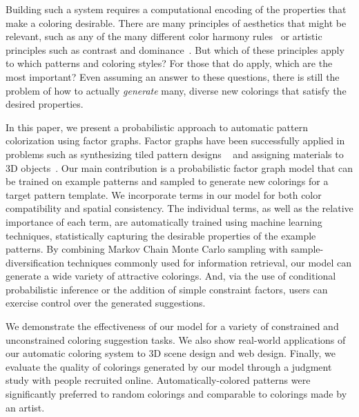 Building such a system requires a computational encoding of the properties that make a coloring desirable. There are many principles of aesthetics that might be relevant, such as any of the many different color harmony rules~\cite{ColorHarmonyBook} or artistic principles such as contrast and dominance~\cite{ArtPrinciples}. But which of these principles apply to which patterns and coloring styles? For those that do apply, which are the most important? Even assuming an answer to these questions, there is still the problem of how to actually \emph{generate} many, diverse new colorings that satisfy the desired properties.

In this paper, we present a probabilistic approach to automatic pattern colorization using factor graphs. Factor graphs have been successfully applied in problems such as synthesizing tiled pattern designs ~\cite{YiTingTiledPatterns} and assigning materials to 3D objects~\cite{MaterialMemex}. Our main contribution is a probabilistic factor graph model that can be trained on example patterns and sampled to generate new colorings for a target pattern template. We incorporate terms in our model for both color compatibility and spatial consistency. The individual terms, as well as the relative importance of each term, are automatically trained using machine learning techniques, statistically capturing the desirable properties of the example patterns. By combining Markov Chain Monte Carlo sampling with sample-diversification techniques commonly used for information retrieval, our model can generate a wide variety of attractive colorings. And, via the use of conditional probabilistic inference or the addition of simple constraint factors, users can exercise control over the generated suggestions.

We demonstrate the effectiveness of our model for a variety of constrained and unconstrained coloring suggestion tasks. We also show real-world applications of our automatic coloring system to 3D scene design and web design. Finally, we evaluate the quality of colorings generated by our model through a judgment study with people recruited online. Automatically-colored patterns were significantly preferred to random colorings and comparable to colorings made by an artist.

